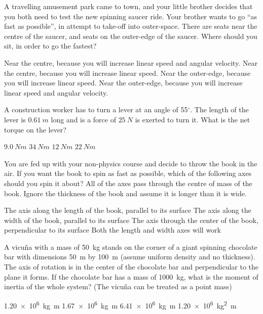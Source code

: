\question A travelling amusement park came to town, and your little brother decides that you both need to test the new spinning saucer ride. Your brother wants to go ``as fast as possible'', in attempt to take-off into outer-space. There are seats near the centre of the saucer, and seats on the outer-edge of the saucer. Where should you sit, in order to go the fastest?
\begin{checkboxes}
\choice Near the centre, because you will increase linear speed and angular velocity.
\choice Near the centre, because you will increase linear speed.
\CorrectChoice Near the outer-edge, because you will increase linear speed. %
\choice Near the outer-edge, because you will increase linear speed and angular velocity.
\end{checkboxes}

\question A construction worker has to turn a lever at an angle of 55$^{\circ}$. The length of the lever is $\SI{0.61}{m}$ long and is a force of $\SI{25}{N}$ is exerted to turn it. What is the net torque on the lever?
\begin{checkboxes}
\choice $\SI{9.0}{Nm}$
\choice $\SI{34}{Nm}$
\CorrectChoice $\SI{12}{Nm}$ \correct
\choice $\SI{22}{Nm}$
\end{checkboxes}

\question You are fed up with your non-physics course and decide to throw the book in the air. If you want the book to spin as fast as possible, which of the following axes should you spin it about? All of the axes pass through the centre of mass of the book. Ignore the thickness of the book and assume it is longer than it is wide.
\begin{checkboxes}
\CorrectChoice The axis along the length of the book, parallel to its surface \correct
\choice The axis along the width of the book, parallel to its surface
\choice The axis through the center of the book, perpendicular to its surface
\choice Both the length and width axes will work
\end{checkboxes}


\question A vicu\~na with a mass of \SI{50}{kg} stands on the corner of a giant spinning chocolate bar with dimensions \SI{50}{m} by \SI{100}{m} (assume uniform density and no thickness). The axis of rotation is in the center of the chocolate bar and perpendicular to the plane it forms. If the chocolate bar has a mass of \SI{1000}{kg}, what is the moment of inertia of the whole system? (The vicu\~na can be treated as a point mass)
\begin{checkboxes}
\CorrectChoice \SI{1.20e6}{kg m} \correct
\choice \SI{1.67e6}{kg m}
\choice \SI{6.41e6}{kg m}
\choice \SI{1.20e6}{kg^2 m}
\end{checkboxes}


